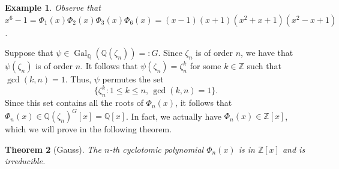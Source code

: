 \documentclass[10pt]{article}
\newcommand{\Z}{\mathbb{Z}}
\newcommand{\Q}{\mathbb{Q}}
\DeclareMathOperator{\Gal}{Gal}
\theoremstyle{newstyle}
\newtheorem{thm}{Theorem}[section]
\newtheorem{exmp}[thm]{Example}
\begin{document}
\begin{exmp}
Observe that $x^6 - 1 = \Phi_1(x)\Phi_2(x)\Phi_3(x)\Phi_6(x) = (x-1)(x+1)(x^2+x+1)(x^2-x+1)$. 
\end{exmp}

Suppose that $\psi \in \Gal_{\Q}(\Q(\zeta_n)) =: G$. Since $\zeta_n$ is of order $n$, we have that 
$\psi(\zeta_n)$ is of order $n$. It follows that $\psi(\zeta_n) = \zeta_n^k$ for some $k \in \Z$ 
such that $\gcd(k, n) = 1$. Thus, $\psi$ permutes the set 
\[ \{\zeta_n^k : 1 \leq k \leq n,\, \gcd(k, n) = 1\}. \]
Since this set contains all the roots of $\Phi_n(x)$, it follows that $\Phi_n(x) 
\in \Q(\zeta_n)^G[x] = \Q[x]$. In fact, we actually have $\Phi_n(x) \in \Z[x]$, which 
we will prove in the following theorem. 

\begin{thm}[Gauss]
The $n$-th cyclotomic polynomial $\Phi_n(x)$ is in $\Z[x]$ and is irreducible. 
\end{thm}
\end{document}
